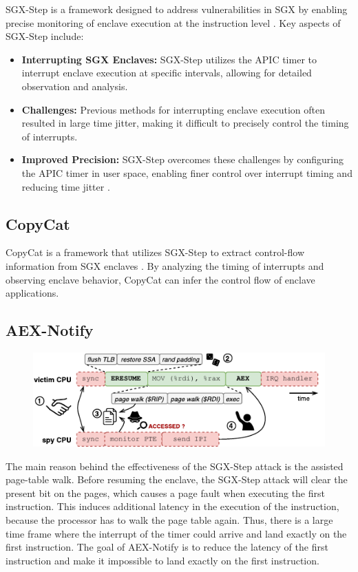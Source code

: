 \documentclass{llncs}
\begin{document}
SGX-Step is a framework designed to address vulnerabilities in SGX by enabling precise monitoring of enclave execution at the instruction level \cite{arnautov2016scone}. Key aspects of SGX-Step include:

\begin{itemize}
    \item \textbf{Interrupting SGX Enclaves:} SGX-Step utilizes the APIC timer to interrupt enclave execution at specific intervals, allowing for detailed observation and analysis.
    \item \textbf{Challenges:} Previous methods for interrupting enclave execution often resulted in large time jitter, making it difficult to precisely control the timing of interrupts.
    \item \textbf{Improved Precision:} SGX-Step overcomes these challenges by configuring the APIC timer in user space, enabling finer control over interrupt timing and reducing time jitter \cite{arnautov2016scone}.
\end{itemize}

\subsection{CopyCat}

CopyCat is a framework that utilizes SGX-Step to extract control-flow information from SGX enclaves \cite{arnautov2016scone}. By analyzing the timing of interrupts and observing enclave behavior, CopyCat can infer the control flow of enclave applications.


\subsection{AEX-Notify}

\begin{figure}[t]
  \centering
  \includegraphics{images/sgx-step-pte.pdf}
  \caption{}
  \label{fig:sgx-step-pte}
\end{figure}

The main reason behind the effectiveness of the SGX-Step attack is the assisted
page-table walk.
Before resuming the enclave, the SGX-Step attack will clear the present bit
on the pages, which causes a page fault when executing the first instruction.
This induces additional latency in the execution of the instruction, because
the processor has to walk the page table again.
Thus, there is a large time frame where the interrupt of the timer could
arrive and land exactly on the first instruction.
The goal of AEX-Notify \cite{ConstableBCXXAK23} is to reduce the latency of the
first instruction and make it impossible to land exactly on the first
instruction.
\end{document}
